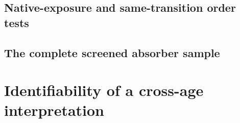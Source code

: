 \subsection{Native-exposure and same-transition order tests}
\label{sec:order_results}


\subsection{The complete screened absorber sample}
\label{sec:archive_results}


\section{Identifiability of a cross-age interpretation}
\label{sec:identifiability}

